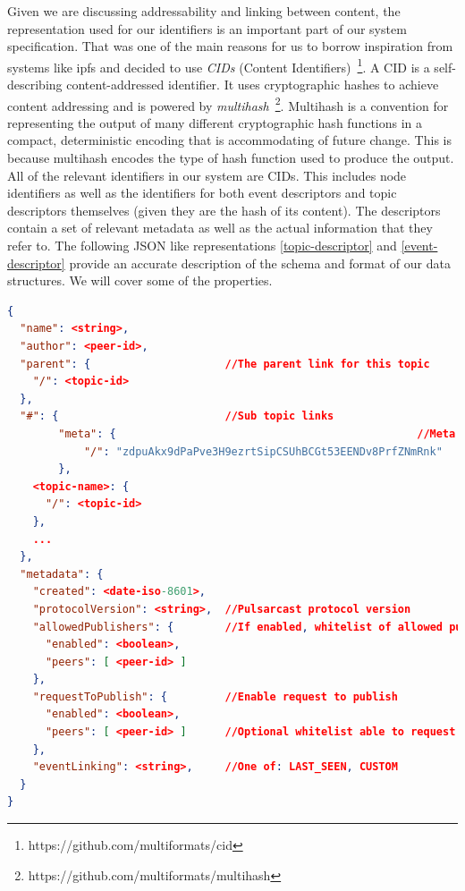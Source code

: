 Given we are discussing addressability and linking between content, the
representation used for our identifiers is an important part of our system
specification. That was one of the main reasons for us to borrow inspiration
from systems like \acrshort{ipfs} and decided to use \emph{CIDs} (Content
Identifiers)~\footnote{https://github.com/multiformats/cid}.  A CID is a
self-describing content-addressed identifier. It uses cryptographic hashes to
achieve content addressing and is powered by
\emph{multihash}~\footnote{https://github.com/multiformats/multihash}.
Multihash is a convention for representing the output of many different
cryptographic hash functions in a compact, deterministic encoding that is
accommodating of future change. This is because multihash encodes the type of
hash function used to produce the output. All of the relevant identifiers in
our system are CIDs. This includes node identifiers as well as the identifiers
for both event descriptors and topic descriptors themselves (given they are the
hash of its content). The descriptors contain a set of relevant metadata as
well as the actual information that they refer to. The following JSON like
representations \ref{topic-descriptor} and \ref{event-descriptor} provide an
accurate description of the schema and format of our data structures. We will
cover some of the properties.

\begin{lstlisting}[float, language=JSON,caption={Topic descriptor schema in a JSON based format},label={topic-descriptor}]
{
  "name": <string>,
  "author": <peer-id>,
  "parent": {                     //The parent link for this topic
    "/": <topic-id>
  },
  "#": {                          //Sub topic links
		"meta": {												//Meta topic
			"/": "zdpuAkx9dPaPve3H9ezrtSipCSUhBCGt53EENDv8PrfZNmRnk"
		},
    <topic-name>: {
      "/": <topic-id>
    },
    ...
  },
  "metadata": {
    "created": <date-iso-8601>,
    "protocolVersion": <string>,  //Pulsarcast protocol version
    "allowedPublishers": {        //If enabled, whitelist of allowed publishers
      "enabled": <boolean>,
      "peers": [ <peer-id> ]
    },
    "requestToPublish": {         //Enable request to publish
      "enabled": <boolean>,
      "peers": [ <peer-id> ]      //Optional whitelist able to request
    },
    "eventLinking": <string>,     //One of: LAST_SEEN, CUSTOM
  }
}
\end{lstlisting}

